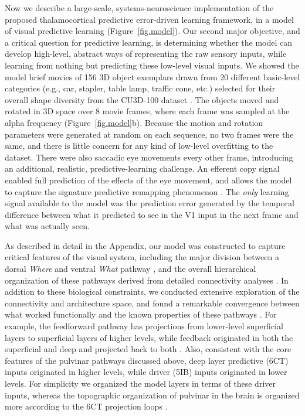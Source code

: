 \documentclass[11pt,twoside]{article}
\newif\myifpdf
\begin{document}
Now we describe a large-scale, systems-neuroscience implementation of the proposed thalamocortical predictive error-driven learning framework, in a model of visual predictive learning (Figure~\ref{fig.model}).  Our second major objective, and a critical question for predictive learning, is determining whether the model can develop high-level, abstract ways of representing the raw sensory inputs, while learning from nothing but predicting these low-level visual inputs.  We showed the model brief movies of 156 3D object exemplars drawn from 20 different basic-level categories (e.g., car, stapler, table lamp, traffic cone, etc.) selected for their overall shape diversity from the CU3D-100 dataset \citep{OReillyWyatteHerdEtAl13}.  The objects moved and rotated in 3D space over 8 movie frames, where each frame was sampled at the alpha frequency (Figure~\ref{fig.model}b).  Because the motion and rotation parameters were generated at random on each sequence, no two frames were the same, and there is little concern for any kind of low-level overfitting to the dataset.  There were also saccadic eye movements every other frame, introducing an additional, realistic, predictive-learning challenge.  An efferent copy signal enabled full prediction of the effects of the eye movement, and allows the model to capture the signature predictive remapping phenomenon \citep{DuhamelColbyGoldberg92,CavanaghHuntAfrazEtAl10,NeupaneGuittonPack17}.  The \emph{only} learning signal available to the model was the prediction error generated by the temporal difference between what it predicted to see in the V1 input in the next frame and what was actually seen.

As described in detail in the Appendix, our model was constructed to capture critical features of the visual system, including the major division between a dorsal \emph{Where} and ventral \emph{What} pathway \citep{UngerleiderMishkin82}, and the overall hierarchical organization of these pathways derived from detailed connectivity analyses \citep{RocklandPandya79,FellemanVanEssen91,MarkovVezoliChameauEtAl14,MarkovErcsey-RavaszGomesEtAl14}.  In addition to these biological constraints, we conducted extensive exploration of the connectivity and architecture space, and found a remarkable convergence between what worked functionally and the known properties of these pathways \citep{OReillyWyatteRohrlich17}.  For example, the feedforward pathway has projections from lower-level superficial layers to superficial layers of higher levels, while feedback originated in both the superficial and deep and projected back to both \citep{RocklandPandya79,FellemanVanEssen91}.  Also, consistent with the core features of the pulvinar pathways discussed above, deep layer predictive (6CT) inputs originated in higher levels, while driver (5IB) inputs originated in lower levels.  For simplicity we organized the model layers in terms of these driver inputs, whereas the topographic organization of pulvinar in the brain is organized more according to the 6CT projection loops \citep{Shipp03}.
\end{document}
